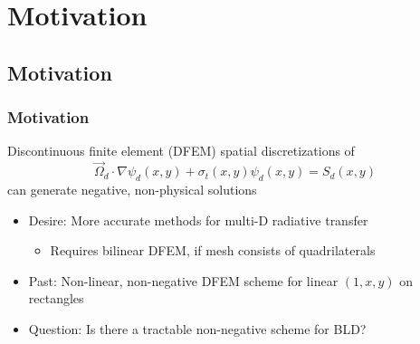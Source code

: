 \documentclass{beamer}
\newcommand{\be}{\begin{equation*}}   %
\newcommand{\ee}{\end{equation*}}
\newcommand{\omg}{\ensuremath{\vec{\Omega}}}
\begin{document}
\section{Motivation}
\subsection{Motivation}
\begin{frame}
\frametitle{Motivation}
Discontinuous finite element (DFEM) spatial discretizations of
\be
\omg_d \cdot \nabla \psi_d(x,y) + \sigma_t(x,y) \psi_d(x,y) = S_d(x,y)
\ee
can generate negative, non-physical solutions

\begin{itemize}
\item Desire: More accurate methods for multi-D radiative transfer
\begin{itemize}
\item Requires bilinear DFEM, if mesh consists of quadrilaterals
\end{itemize}
\item Past: Non-linear, non-negative DFEM scheme for linear $(1,x,y)$ on rectangles
\item Question: Is there a tractable non-negative scheme for BLD?
\end{itemize}
%
\end{frame}

\end{document}
